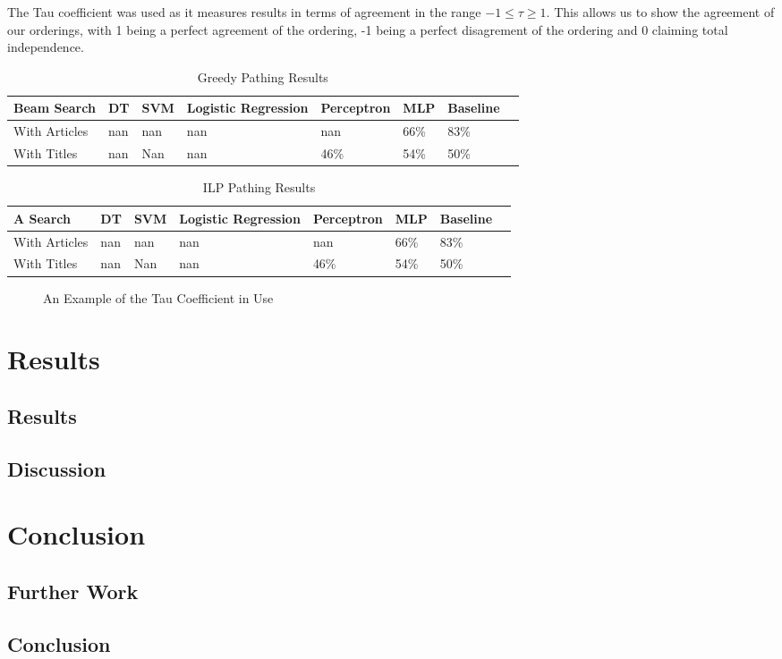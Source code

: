 \documentclass[bsc,frontabs,twoside,singlespacing,parskip,deptreport]{infthesis}     %
\begin{document}
The Tau coefficient was used as it measures results in terms of agreement in the range $-1 \leq \tau \geq 1$.
This allows us to show the agreement of our orderings, with 1 being a perfect agreement of the ordering, -1 being a perfect disagrement of the ordering and 0 claiming
total independence.


\begin{table}[H]
\centering
\label{table:greedy-results}
\begin{tabular}{|l|l|l|l|l|l|l|l|}
  \hline
  Beam Search & DT & SVM &Logistic Regression & Perceptron & MLP & Baseline\\
  \hline
With Articles & nan & nan &nan& nan   & 66\%  & 83\%\\
\hline
With Titles & nan & Nan & nan &46\%  & 54\% & 50\%\\
\hline
\end{tabular}
\caption{Greedy Pathing Results}
\end{table}



\begin{table}[H]
\centering
\label{table:ILP-results}
\begin{tabular}{|l|l|l|l|l|l|l|l|}
  \hline
  A\* Search & DT & SVM &Logistic Regression & Perceptron & MLP & Baseline\\
  \hline
With Articles & nan & nan &nan& nan   & 66\%  & 83\%\\
\hline
With Titles & nan & Nan & nan &46\%  & 54\% & 50\%\\
\hline
\end{tabular}
\caption{ILP Pathing Results}
\end{table}


\begin{figure}
  \caption{An Example of the Tau Coefficient in Use}
  \label{fig:tau}
\end{figure}




\chapter{Results}
\section{Results}
\section{Discussion}
\chapter{Conclusion}
\section{Further Work}
\section{Conclusion}


\end{document}
